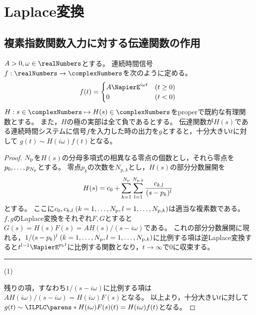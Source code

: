 \part{Laplace変換}
    \chapter{複素指数関数入力に対する伝達関数の作用}
        \begin{shadebox}
            $A>0,\omega \in \realNumbers$とする。
            連続時間信号$f: \realNumbers \to \complexNumbers$を次のように定める。
            \[
                f(t) =
                \begin{cases}
                    A\NapierE^{i\omega t} & (t\geq 0) \\
                    0 & (t<0)
                \end{cases}
            \]
            $H: s\in\complexNumbers \mapsto H(s) \in \complexNumbers$をproperで既約な有理関数とする。
            また，$H$の極の実部は全て負であるとする。
            伝達関数が$H(s)$である連続時間システムに信号$f$を入力した時の出力を$g$とすると，十分大きい$t$に対して
            $g(t) \sim H(i\omega)f(t)$となる。
        \end{shadebox}
        \begin{proof}
            ${N_\mathrm{p}}$を$H(s)$の分母多項式の相異なる零点の個数とし，それら零点を$p_0,\dots,p_{{N_\mathrm{p}}}$とする。
            零点$p_k$の次数を$N_{\mathrm{p},k}$とし，$H(s)$の部分分数展開を
            \[ H(s) = c_0 + \sum_{k=1}^{{N_\mathrm{p}}} \sum_{l=1}^{N_{\mathrm{p},k}} \frac{c_{k,l}}{(s-p_k)^l} \]
            とする。
            ここに$c_0,c_{k,l}\;(k=1,\dots,{N_\mathrm{p}},l=1,\dots,N_{\mathrm{p},k})$は適当な複素数である。
            $f,g$のLaplace変換をそれぞれ$F,G$とすると$G(s) = H(s)F(s) = A H(s)/(s-i\omega)$である。
            これの部分分数展開に現れる，$1/(s-p_k)^l\;(k=1,\dots,{N_\mathrm{p}},l=1,\dots,N_{\mathrm{p},k})$に比例する項は逆Laplace変換すると$t^{l-1}\NapierE^{p_k t}$に比例する関数となり，$t\to\infty$で0に収束する。\hfill \rule{10cm}{0.4pt}(1)
            \par
            残りの項，すなわち$1/(s-i\omega)$に比例する項は$AH(i\omega)/(s-i\omega) = H(i\omega)F(s)$となる。
            以上より，十分大きい$t$に対して$g(t) \sim \ILPLC\parens*{H(i\omega)F(s)}(t) = H(i\omega)f(t)$となる。
        \end{proof}

